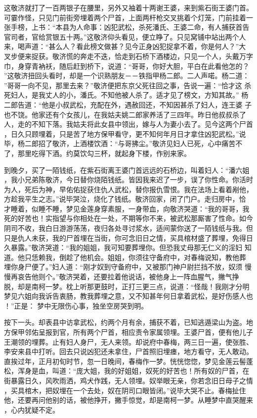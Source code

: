 这敬济就打了一百两银子在腰里，另外又袖着十两谢王婆，来到紫石街王婆门首。
可霎作怪，只见门前街旁埋着两个尸首，上面两杆枪交叉挑着个灯笼，门前挂着一
张手榜，上书：“本县为人命事：凶犯武松，杀死潘氏、王婆二命，有人捕获首告
官司者，官给赏银五十两。”这敬济仰头看见，便立睁了。只见窝铺中站出两个人
来，喝声道：“甚么人？看此榜文做甚？见今正身凶犯捉拿不着，你是何人？”大
叉步便来捉获。敬济慌的奔走不迭，恰走到石桥下酒楼边，只见一个人，头戴万字
巾，身穿青衲袄，随后赶到桥下，说道：“哥哥，你好大胆，平白在此看他怎的？
”这敬济扭回头看时，却是一个识熟朋友－－铁指甲杨二郎。二人声喏。杨二道：
”哥哥一向不见，那里去来？”敬济便把东京父死往回之事，告说一遍：“恰才这
杀死妇人，是我丈人的小，潘氏。不知他被人杀了。适才见了榜文，方知其故。”
杨二郎告道：“他是小叔武松，充配在外，遇赦回还，不知因甚杀了妇人，连王婆
子也不饶。他家还有个女孩儿，在我姑夫姚二郎家养活了三四年。昨日他叔叔杀了
人，走的不知下落。我姑夫将此女县中领出，嫁与人为妻小去了。见今这两个尸首
，日久只顾埋着，只是苦了地方保甲看守，更不知何年月日才拿住凶犯武松。”说
毕，杨二郎招了敬济，上酒楼饮酒：“与哥拂尘。”敬济见妇人已死，心中痛苦不
了，那里吃得下酒。约莫饮勾三杯，就起身下楼，作别来家。

到晚夕，买了一陌钱纸，在紫石街离王婆门首远远的石桥边，叫着妇人：“潘六姐
，我小兄弟陈敬济，今日替你烧陌钱纸。皆因我来迟了一步，误了你性命。你活时
为人，死后为神，早佑佑捉获住仇人武松，替你报仇雪恨。我在法场上看着剐他，
方趁我平生之志。”说毕哭泣，烧化了钱纸。敬济回家，闭了门户。走归房中，恰
才睡着，似睡不睡，梦见金莲身穿素服，一身带血，向敬济哭道：“我的哥哥，我
死的好苦也！实指望与你相处在一处，不期等你不来，被武松那厮害了性命。如今
阴司不收，我白日游游荡荡，夜归各处寻讨浆水，适间蒙你送了一陌钱纸与我。但
只是仇人未获，我的尸首埋在当街，你可念旧日之情，买具棺材盛了葬埋，免得日
久暴露。”敬济哭道：“我的姐姐，我可知要葬埋你。但恐我丈母那无仁义的淫妇
知道。他只恁赖我，倒趁了他机会。姐姐，你须往守备府中，对春梅说知，教他葬
埋你身尸便了。”妇人道：“刚才奴到守备府中，又被那门神户尉拦挡不放，奴须
慢慢再哀告他则个。”敬济哭着，还要拉着他说话，被他身上一阵血腥气，撇气挣
脱，却是南柯一梦。枕上听那更鼓时，正打三更三点，说道：“怪哉！我刚才分明
梦见六姐向我诉告衷肠，教我葬埋之意，又不知甚年何日拿着武松，是好伤感人也
！”正是：
梦中无限伤心事，独坐空房哭到明。

按下一头。却表县中访拿武松，约两个月有余，捕获不着，已知逃遁梁山为盗。地
方保甲邻佑呈报到官，所有两个尸首，相应责令家属领埋。王婆尸首，便有他儿子
王潮领的埋葬。止有妇人身尸，无人来领。却说府中春梅，两三日一遍，使张胜、
李安来县中打听。回去只说凶犯还未拿住，尸首照旧埋瘗，地方看守，无人敢动。
直挨过年，正月初旬时节，忽一日晚间，春梅作一梦。恍恍惚惚，梦见金莲云髻蓬
松，浑身是血，叫道：“庞大姐，我的好姐姐，奴死的好苦也！所有奴的尸首，在
街暴露日久，风吹雨洒，鸡犬作践，无人领埋。奴举眼无亲，你若念旧日母子之情
，买具棺木，把奴埋在一个去处，奴在阴司口眼皆闭。”说毕大哭不止。春梅扯住
他，还要再问他别的话，被他挣开，撇手惊觉，却是南柯一梦。从睡梦中直哭醒来
，心内犹疑不定。

